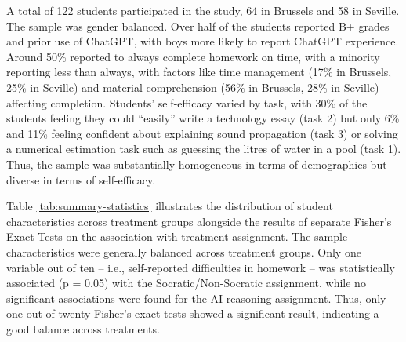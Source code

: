 \documentclass[
  11pt,
]{article}
\begin{document}
A total of 122 students participated in the study, 64 in Brussels and 58 in Seville. The sample was gender balanced. Over half of the students reported B+ grades and prior use of ChatGPT, with boys more likely to report ChatGPT experience. Around 50\% reported to always complete homework on time, with a minority reporting less than always, with factors like time management (17\% in Brussels, 25\% in Seville) and material comprehension (56\% in Brussels, 28\% in Seville) affecting completion. Students' self-efficacy varied by task, with 30\% of the students feeling they could ``easily'' write a technology essay (task 2) but only 6\% and 11\% feeling confident about explaining sound propagation (task 3) or solving a numerical estimation task such as guessing the litres of water in a pool (task 1). Thus, the sample was substantially homogeneous in terms of demographics but diverse in terms of self-efficacy.

Table \ref{tab:summary-statistics} illustrates the distribution of student characteristics across treatment groups alongside the results of separate Fisher's Exact Tests on the association with treatment assignment. The sample characteristics were generally balanced across treatment groups. Only one variable out of ten -- i.e., self-reported difficulties in homework -- was statistically associated (p = 0.05) with the Socratic/Non-Socratic assignment, while no significant associations were found for the AI-reasoning assignment. Thus, only one out of twenty Fisher's exact tests showed a significant result, indicating a good balance across treatments.
\end{document}
